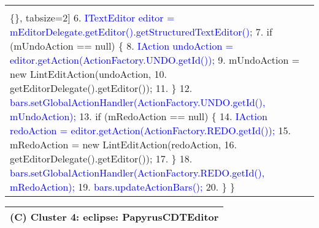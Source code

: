 \begin{figure*}[!htb]
\begin{minipage}{0.5\textwidth}
\begin{tabular}{@{}p{}}
\begin{Verbatim}[commandchars=\\\{\}, tabsize=2]
6. \textcolor{blue}{   ITextEditor editor = mEditorDelegate.getEditor().getStructuredTextEditor();}
7.      if (mUndoAction == null) \{
8. \textcolor{blue}{	         IAction undoAction = editor.getAction(ActionFactory.UNDO.getId());}
9.          mUndoAction = new LintEditAction(undoAction, 
10.           getEditorDelegate().getEditor());
11.     \}
12.\textcolor{blue}{	     bars.setGlobalActionHandler(ActionFactory.UNDO.getId(), mUndoAction);}
13.     if (mRedoAction == null) \{
14.\textcolor{blue}{	         IAction redoAction = editor.getAction(ActionFactory.REDO.getId());}
15.         mRedoAction = new LintEditAction(redoAction, 
16.         getEditorDelegate().getEditor());
17.    \}
18.\textcolor{blue}{	    bars.setGlobalActionHandler(ActionFactory.REDO.getId(), mRedoAction);}
19.\textcolor{blue}{	    bars.updateActionBars();}
20.    \}  \}
   \end{Verbatim}
      \vspace{-4mm}
     \\   
\end{tabular} 
\end{minipage}
%     
\begin{minipage}{0.5\textwidth}
\scriptsize 
\begin{tabular}{@{}p{}} 
 \hline 
  \multicolumn{1}{c}{(C) Cluster 4: eclipse: PapyrusCDTEditor} \\ \hline

\end{tabular}
\end{minipage}
\end{figure*}
